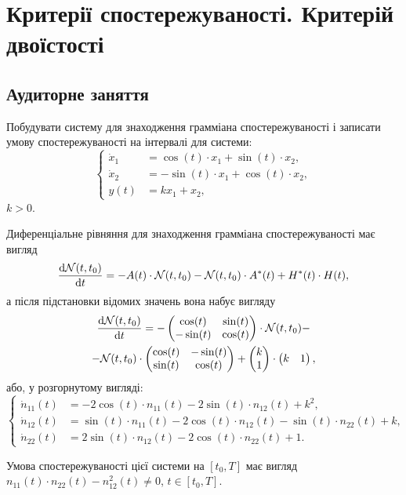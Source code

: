 
\section{Критерії спостережуваності. Критерій двоїстості}

\subsection{Аудиторне заняття}

\begin{problem}
	Побудувати систему для знаходження грамміана спостережуваності і записати умову спостережуваності на інтервалі для системи: \[
	\left\{
		\begin{aligned}
			\dot x_1 &= \cos(t) \cdot x_1 + \sin(t) \cdot x_2, \\
			\dot x_2 &= - \sin(t) \cdot x_1 + \cos(t) \cdot x_2, \\
			y(t) &= k x_1 + x_2,
		\end{aligned}
	\right.
	\]
	$k > 0$.
\end{problem}

\begin{solution}
	Диференціальне рівняння для знаходження грамміана спостережуваності має вигляд \[ \frac{\mathop{}\!\mathrm{d} \mathcal{N}(t, t_0)}{\mathop{}\!\mathrm{d} t} = -A(t) \cdot \mathcal{N}(t, t_0) - \mathcal{N}(t, t_0) \cdot A^*(t) + H^*(t) \cdot H(t), \] а після підстановки відомих значень вона набує вигляду \begin{multline*} 
		\frac{\mathop{}\!\mathrm{d} \mathcal{N}(t, t_0)}{\mathop{}\!\mathrm{d} t} = -\begin{pmatrix} \cos (t) & \sin(t) \\ - \sin(t) & \cos(t) \end{pmatrix} \cdot \mathcal{N}(t, t_0) - \\
		- \mathcal{N}(t, t_0) \cdot \begin{pmatrix} \cos (t) & -\sin(t) \\ \sin(t) & \cos(t) \end{pmatrix} + \begin{pmatrix} k \\ 1 \end{pmatrix} \cdot \begin{pmatrix} k & 1 \end{pmatrix}, 
	\end{multline*} або, у розгорнутому вигляді: \[
	\left\{
		\begin{aligned}
			\dot n_{11} (t) &= - 2 \cos(t) \cdot n_{11} (t) - 2 \sin(t) \cdot n_{12} (t) + k^2, \\
			\dot n_{12} (t) &= \sin (t) \cdot n_{11} (t) - 2\cos(t) \cdot n_{12} (t) - \sin (t) \cdot n_{22} (t) + k, \\
			\dot n_{22} (t) &= 2 \sin(t) \cdot n_{12} (t) - 2 \cos(t) \cdot n_{22} (t) + 1.
		\end{aligned}
	\right.
	\]

	Умова спостережуваності цієї системи на $[t_0, T]$ має вигляд  $n_{11} (t) \cdot n_{22} (t) - n_{12}^2 (t) \ne 0$, $t \in [t_0, T]$.
\end{solution}

